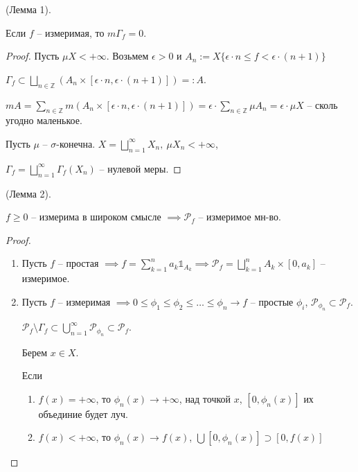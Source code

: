 \begin{lemma}
    (Лемма 1).
    
    Если $f$ -- измеримая, то $m \Gamma_f = 0$.
\end{lemma}
\begin{proof}
    Пусть $\mu X < +\infty$. Возьмем $\epsilon > 0$ и $A_n := X \{ \epsilon \cdot n \leq f < \epsilon \cdot (n + 1) \}$

    $\Gamma_f \subset \bigsqcup_{n \in \mathbb{Z}} \left(A_n \times [\epsilon \cdot n, \epsilon \cdot (n + 1)]\right) =: A$.


    $m A = \sum_{n \in \mathbb{Z}} m \left( A_n \times [\epsilon \cdot n, \epsilon \cdot (n + 1)] \right) = \epsilon \cdot \sum_{n \in \mathbb{Z}} \mu A_n = \epsilon \cdot \mu X$ -- сколь угодно маленькое.

    Пусть $\mu$ -- $\sigma$-конечна. $X = \bigsqcup_{n=1}^{\infty} X_n, \ \mu X_n < +\infty$,
    
    $\Gamma_f = \bigsqcup_{n=1}^{\infty} \Gamma_f (X_n)$ -- нулевой меры.
\end{proof}

\begin{lemma}
    (Лемма 2).

    $f \geq 0$ -- измерима в широком смысле $\implies \mathcal{P}_f$ -- измеримое мн-во.
\end{lemma}
\begin{proof}
    \begin{enumerate}
        \item {
            Пусть $f$ -- простая $\implies f = \sum_{k = 1}^{n} a_k \mathbb{1}_{A_k} \implies \mathcal{P}_f = \bigsqcup_{k=1}^{n} A_k \times [0, a_k]$ -- измеримое.
        }

        \item {
            Пусть $f$ -- измеримая $\implies 0 \leq \phi_1 \leq \phi_2 \leq \dots \leq \phi_n \rightarrow f$ -- простые $\phi_i$, $\mathcal{P}_{\phi_n} \subset \mathcal{P}_f$.

            $\mathcal{P}_f \setminus \Gamma_f \subset \bigcup_{n=1}^{\infty} \mathcal{P}_{\phi_n} \subset \mathcal{P}_f$.

            Берем $x \in X$.
            
            Если
            \begin{enumerate}
                \item {
                    $f(x) = +\infty$, то $\phi_n(x) \rightarrow +\infty$, над точкой $x$, $[0, \phi_n(x)]$ их объединие будет луч.
                }
                \item {
                    $f(x) < +\infty$, то $\phi_n(x) \rightarrow f(x)$, $\bigcup [0, \phi_n(x)] \supset [0, f(x)]$
                }
            \end{enumerate}
        }
    \end{enumerate}
\end{proof}

